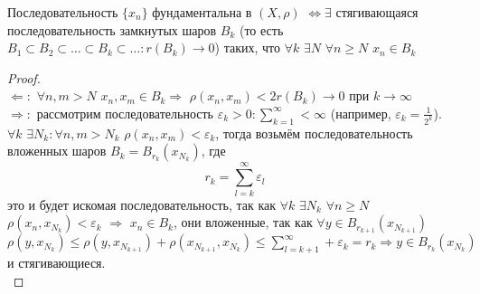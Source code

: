 \begin{claim}
	Последовательность $\{ x_n \}$ фундаментальна в $(X, \rho)$ $\Leftrightarrow \exists$ стягивающаяся последовательность замкнутых шаров $B_k$ (то есть $B_1 \subset B_2 \subset \ldots \subset B_k \subset \ldots : r(B_k) \to 0$) таких, что $\forall k$ $\exists N$ $\forall n \ge N$ $x_n \in B_k$ \\
	\begin{proof} \\
		$\Leftarrow:$ $\forall n, m > N$ $x_n, x_m \in B_k \Rightarrow$ $\rho(x_n, x_m) < 2r(B_k) \to 0$ при $k \to \infty$ \\
		$\Rightarrow:$ рассмотрим последовательность $\varepsilon_k > 0 : \sum_{k=1}^{\infty} < \infty$ (например, $\varepsilon_k = \frac{1}{2^k}$). \\
		$\forall k$ $\exists N_k : \forall n, m > N_k$ $\rho(x_n, x_m) < \varepsilon_k$, тогда возьмём последовательность вложенных шаров $B_k = B_{r_k}(x_{N_k})$, где 
\[ r_k = \sum_{l = k}^{\infty}\varepsilon_l\]
это и будет искомая последовательность, так как $\forall k$ $\exists N_k$ $\forall n \ge N$ $\rho(x_n, x_{N_k}) < \varepsilon_k$ $\Rightarrow$ $x_n \in B_k$, они вложенные, так как $\forall y \in B_{r_{k+1}}(x_{N_{k+1}})$ $\rho(y, x_{N_k}) \le \rho(y, x_{N_{k+1}}) + \rho(x_{N_{k+1}}, x_{N_k}) \le \sum_{l = k + 1}^{\infty} + \varepsilon_k = r_k \Rightarrow y \in B_{r_k}(x_{N_k})$ и стягивающиеся. \\
	\end{proof}
\end{claim}
















































